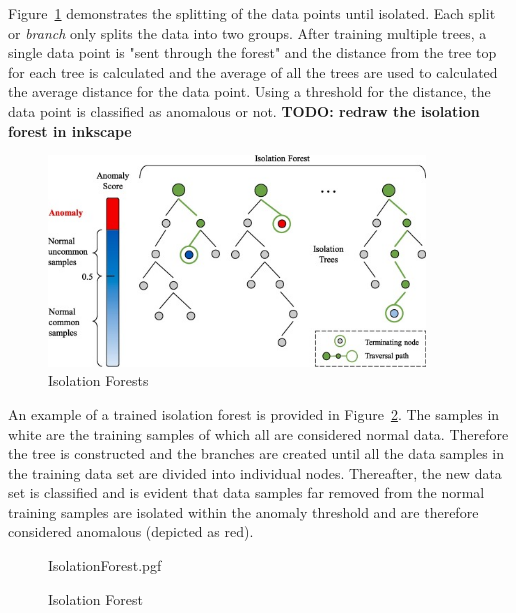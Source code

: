 Figure~\ref{Figure-Isolation_Forest} demonstrates the splitting of the data points until isolated. Each split or \emph{branch} only splits the data into two groups. After training multiple trees, a single data point is "sent through the forest" and the distance from the tree top for each tree is calculated and the average of all the trees are used to calculated the average distance for the data point. Using a threshold for the distance, the data point is classified as anomalous or not.
\textbf{TODO: redraw the isolation forest in inkscape}
\begin{figure}[h!tb]
	\centering
	
	\includegraphics[width=10cm]{fig/Isolation_Forests} %
	
	\caption[Isolation Forest]{Isolation Forests \cite{Chen2020}}
	\label{Figure-Isolation_Forest} 
\end{figure}

An example of a trained isolation forest is provided in Figure~\ref{fig:IsolationForest}. The samples in white are the training samples of which all are considered normal data. Therefore the tree is constructed and the branches are created until all the data samples in the training data set are divided into individual nodes. Thereafter, the new data set is classified and is evident that data samples far removed from the normal training samples are isolated within the anomaly threshold and are therefore considered anomalous (depicted as red).
\begin{figure}[!hbt]
	\centering
	{IsolationForest.pgf}
	\caption{Isolation Forest}
	\label{fig:IsolationForest}
\end{figure}

